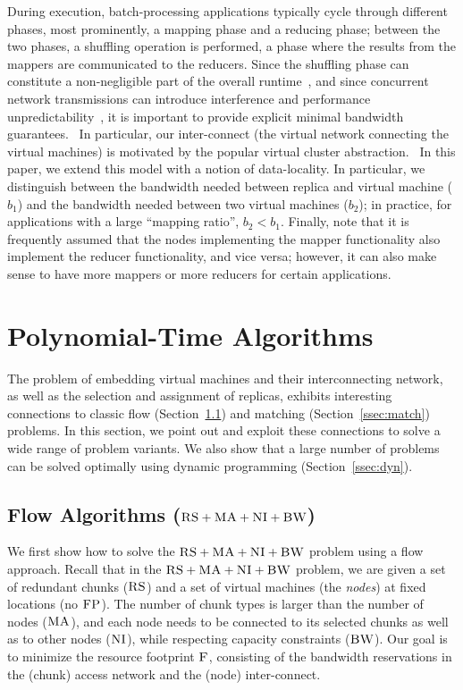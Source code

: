 \documentclass[9pt,twocolumn]{scrartcl}
\newcommand{\CC}{\textsc{NI}}
\newcommand{\FP}{\textsc{FP}}
\newcommand{\RS}{\textsc{RS}}
\newcommand{\BW}{\textsc{BW}}
\newcommand{\MA}{\textsc{MA}}
\newcommand{\Cost}{\textsc{F}}
\newcommand{\CostTrans}{\ensuremath{b_1}}
\newcommand{\CostCom}{\ensuremath{b_2}}
\begin{document}
During execution, batch-processing applications typically cycle through different phases,
most prominently, a mapping phase and a reducing phase; between the two phases,
a shuffling operation is performed, a phase where the results from the mappers
are communicated to the reducers. Since the shuffling phase can constitute a
non-negligible part of the overall runtime~\cite{orchestra},
and since concurrent network transmissions can introduce interference and
performance unpredictability~\cite{amazonbw}, it is important
to provide explicit minimal bandwidth guarantees.~\cite{talk-about}
In particular, our inter-connect (the virtual network connecting the virtual machines)
is motivated by the popular virtual cluster abstraction.~\cite{oktopus,talk-about,proteus}
In this paper, we extend this model with a notion of data-locality.
In particular, we distinguish between the bandwidth needed between replica
and virtual machine ($\CostTrans$) and the bandwidth needed between
two virtual machines ($\CostCom$); in practice, for applications with a large
``mapping ratio'', $\CostCom<\CostTrans$. Finally, note that it is frequently assumed
that the nodes implementing the mapper functionality also implement the reducer functionality,
and vice versa; however, it can also make sense to have more mappers or more reducers for
certain applications.

\section{Polynomial-Time Algorithms}\label{sec:poly}

The problem of embedding virtual machines and their interconnecting network,
as well as the selection and assignment of replicas,
exhibits interesting connections to classic flow (Section~\ref{ssec:flow}) and
matching (Section~\ref{ssec:match}) problems. In this section, we point out and exploit these connections 
to solve a wide range
of problem variants. We also show that a large number of problems
can be solved optimally using dynamic programming (Section~\ref{ssec:dyn}).

\subsection{Flow Algorithms ($\RS+\MA+\CC+\BW$)}\label{ssec:flow}

We first show how to solve
the $\RS+\MA+\CC+\BW$ problem using a flow approach.
Recall that in the $\RS+\MA+\CC+\BW$ problem,
we are given a set of redundant chunks ($\RS$) and a set of virtual machines
(the \emph{nodes})
at fixed locations (no $\FP$). The number of chunk types is larger than the number
of nodes ($\MA$), and each node needs to be connected
to its selected chunks as well as to other nodes ($\CC$), while respecting
capacity constraints ($\BW$).
Our goal is to minimize the resource footprint $\Cost$, consisting
of the bandwidth reservations in the (chunk) access network and the (node) inter-connect.
\end{document}
